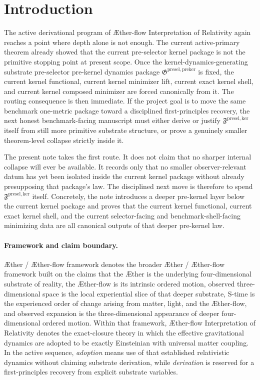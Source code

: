 \documentclass[11pt]{article}
\newcommand{\Aether}{\AE{}ther}
\newcommand{\Aflow}{\AE{}ther-flow}
\newcommand{\TheoryName}{\Aflow{} Interpretation of Relativity}
\newcommand{\TheoryProgram}{\Aether{} / \Aflow{} framework}
\newcommand{\KernelPackage}{\mathfrak F^{\mathrm{presel,ker}}}
\newcommand{\PreKernelPackage}{\mathfrak G^{\mathrm{presel,preker}}}
\begin{document}
\section{Introduction}

The active derivational program of \TheoryName{} again reaches a point where depth alone is not enough. The current active-primary theorem already showed that the current pre-selector kernel package is not the primitive stopping point at present scope. Once the kernel-dynamics-generating substrate pre-selector pre-kernel dynamics package \(\PreKernelPackage\) is fixed, the current kernel functional, current kernel minimizer lift, current exact kernel shell, and current kernel composed minimizer are forced canonically from it. The routing consequence is then immediate. If the project goal is to move the same benchmark one-metric package toward a disciplined first-principles recovery, the next honest benchmark-facing manuscript must either derive or justify \(\KernelPackage\) itself from still more primitive substrate structure, or prove a genuinely smaller theorem-level collapse strictly inside it.

The present note takes the first route. It does not claim that no sharper internal collapse will ever be available. It records only that no smaller observer-relevant datum has yet been isolated inside the current kernel package without already presupposing that package's law. The disciplined next move is therefore to spend \(\KernelPackage\) itself. Concretely, the note introduces a deeper pre-kernel layer below the current kernel package and proves that the current kernel functional, current exact kernel shell, and the current selector-facing and benchmark-shell-facing minimizing data are all canonical outputs of that deeper pre-kernel law.

\paragraph{Framework and claim boundary.}
\TheoryProgram{} denotes the broader \Aether{} / \Aflow{} framework built on the claims that the \Aether{} is the underlying four-dimensional substrate of reality, the \Aflow{} is its intrinsic ordered motion, observed three-dimensional space is the local experiential slice of that deeper substrate, S-time is the experienced order of change arising from matter, light, and the \Aflow{}, and observed expansion is the three-dimensional appearance of deeper four-dimensional ordered motion. Within that framework, \TheoryName{} denotes the exact-closure theory in which the effective gravitational dynamics are adopted to be exactly Einsteinian with universal matter coupling. In the active sequence, \emph{adoption} means use of that established relativistic dynamics without claiming substrate derivation, while \emph{derivation} is reserved for a first-principles recovery from explicit substrate variables.
\end{document}
